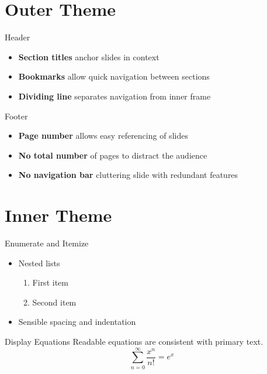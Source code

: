 \documentclass{beamer}
\begin{document}
\section{Outer Theme}

\sectionpage

\begin{frame}{Header}
	\begin{itemize}
		\item \textbf{Section titles} anchor slides in context
		\item \textbf{Bookmarks} allow quick navigation between sections
		\item \textbf{Dividing line} separates navigation from inner frame
	\end{itemize}
\end{frame}

\begin{frame}{Footer}
	\begin{itemize}
		\item \textbf{Page number} allows easy referencing of slides
		\item \textbf{No total number} of pages to distract the audience
		\item \textbf{No navigation bar} cluttering slide with redundant features
	\end{itemize}
\end{frame}

\section{Inner Theme}

\begin{frame}{Enumerate and Itemize}
	\begin{itemize}
		\item Nested lists
			\begin{enumerate}
				\item First item
				\item Second item
			\end{enumerate}
		\item
			Sensible spacing and indentation
	\end{itemize}
\end{frame}

\begin{frame}{Display Equations}
	Readable equations are consistent with primary text.
	\begin{equation*}
		\sum_{n = 0}^{\infty} \frac{x^n}{n!} = e^{x}
	\end{equation*}
\end{frame}
\end{document}
